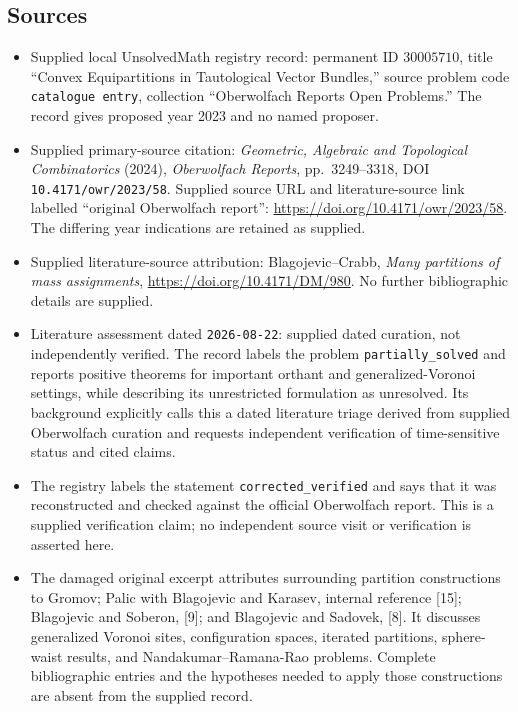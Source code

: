 \documentclass[11pt]{article}
\begin{document}
\subsection{Sources}
\begin{itemize}
\item Supplied local UnsolvedMath registry record: permanent ID \(30005710\), title ``Convex Equipartitions in Tautological Vector Bundles,'' source problem code \texttt{catalogue entry}, collection ``Oberwolfach Reports Open Problems.'' The record gives proposed year 2023 and no named proposer.
\item Supplied primary-source citation: \emph{Geometric, Algebraic and Topological Combinatorics} (2024), \emph{Oberwolfach Reports}, pp.~3249--3318, DOI \texttt{10.4171/owr/2023/58}. Supplied source URL and literature-source link labelled ``original Oberwolfach report'': \url{https://doi.org/10.4171/owr/2023/58}. The differing year indications are retained as supplied.
\item Supplied literature-source attribution: Blagojevic--Crabb, \emph{Many partitions of mass assignments}, \url{https://doi.org/10.4171/DM/980}. No further bibliographic details are supplied.
\item Literature assessment dated \texttt{2026-08-22}: supplied dated curation, not independently verified. The record labels the problem \texttt{partially\_solved} and reports positive theorems for important orthant and generalized-Voronoi settings, while describing its unrestricted formulation as unresolved. Its background explicitly calls this a dated literature triage derived from supplied Oberwolfach curation and requests independent verification of time-sensitive status and cited claims.
\item The registry labels the statement \texttt{corrected\_verified} and says that it was reconstructed and checked against the official Oberwolfach report. This is a supplied verification claim; no independent source visit or verification is asserted here.
\item The damaged original excerpt attributes surrounding partition constructions to Gromov; Palic with Blagojevic and Karasev, internal reference [15]; Blagojevic and Soberon, [9]; and Blagojevic and Sadovek, [8]. It discusses generalized Voronoi sites, configuration spaces, iterated partitions, sphere-waist results, and Nandakumar--Ramana-Rao problems. Complete bibliographic entries and the hypotheses needed to apply those constructions are absent from the supplied record.
\end{itemize}
\end{document}
